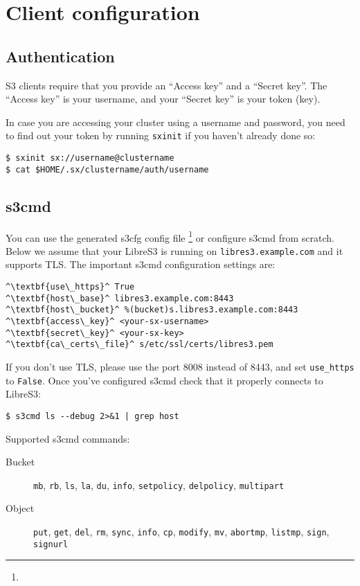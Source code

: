 \chapter{Client configuration}
\section{Authentication}
S3 clients require that you provide an ``Access key'' and a ``Secret key''.
The ``Access key'' is your \SX username, and your ``Secret key'' is your \SX
token (key).

In case you are accessing your \SX cluster using a username and password,
you need to find out your \SX token by running \verb|sxinit| if you haven't
already done so:
\begin{lstlisting}
$ sxinit sx://username@clustername
$ cat $HOME/.sx/clustername/auth/username
\end{lstlisting}

\section{s3cmd}
\label{sec:s3cmd}

You can use the generated s3cfg config file
\footnote{}
 or configure s3cmd from scratch.
Below we assume that your LibreS3
is running on \verb|libres3.example.com| and it supports TLS\@.
The important s3cmd configuration settings are:

\begin{lstlisting}
^\textbf{use\_https}^ True
^\textbf{host\_base}^ libres3.example.com:8443
^\textbf{host\_bucket}^ %(bucket)s.libres3.example.com:8443
^\textbf{access\_key}^ <your-sx-username>
^\textbf{secret\_key}^ <your-sx-key>
^\textbf{ca\_certs\_file}^ s/etc/ssl/certs/libres3.pem
\end{lstlisting}


If you don't use TLS, please use the port 8008 instead of 8443, and set
\verb|use_https| to \verb|False|. Once you've configured s3cmd check
that it properly connects to LibreS3:

\begin{lstlisting}
$ s3cmd ls --debug 2>&1 | grep host
\end{lstlisting}


Supported s3cmd commands:
\begin{description}
    \item[Bucket] \verb|mb|, \verb|rb|, \verb|ls|, \verb|la|, \verb|du|, \verb|info|,
		\verb|setpolicy|, \verb|delpolicy|,
		\verb|multipart|
    \item[Object] \verb|put|, \verb|get|, \verb|del|, \verb|rm|, \verb|sync|, \verb|info|,
        \verb|cp|, \verb|modify|, \verb|mv|, \verb|abortmp|, \verb|listmp|,
        \verb|sign|, \verb|signurl|
\end{description}

